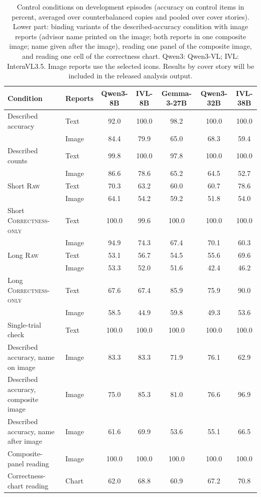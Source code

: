 \documentclass[letterpaper]{article} %
\newcommand{\Raw}{\textsc{Raw}}
\newcommand{\CorrectnessOnly}{\textsc{Correctness-only}}
\begin{document}
\begin{table}[!t]\centering\small
  \setlength{\tabcolsep}{4pt}
  \begin{tabular}{ll ccccc}
    \toprule
    Condition & Reports & Qwen3-8B & IVL-8B & Gemma-3-27B & Qwen3-32B & IVL-38B \\
    \midrule
    Described accuracy & Text & 92.0 & 100.0 & 98.2 & 100.0 & 100.0 \\
     & Image & 84.4 & 79.9 & 65.0 & 68.3 & 59.4 \\
    Described counts & Text & 99.8 & 100.0 & 97.8 & 100.0 & 100.0 \\
     & Image & 86.6 & 78.6 & 65.2 & 64.5 & 52.7 \\
    Short \Raw{} & Text & 70.3 & 63.2 & 60.0 & 60.7 & 78.6 \\
     & Image & 64.1 & 54.2 & 59.2 & 51.8 & 54.0 \\
    Short \CorrectnessOnly{} & Text & 100.0 & 99.6 & 100.0 & 100.0 & 100.0 \\
     & Image & 94.9 & 74.3 & 67.4 & 70.1 & 60.3 \\
    Long \Raw{} & Text & 53.1 & 56.7 & 54.5 & 55.6 & 69.6 \\
     & Image & 53.3 & 52.0 & 51.6 & 42.4 & 46.2 \\
    Long \CorrectnessOnly{} & Text & 67.6 & 67.4 & 85.9 & 75.9 & 90.0 \\
     & Image & 58.5 & 44.9 & 59.8 & 49.3 & 53.6 \\
    Single-trial check & Text & 100.0 & 100.0 & 100.0 & 100.0 & 100.0 \\
    \midrule
    Described accuracy, name on image & Image & 83.3 & 83.3 & 71.9 & 76.1 & 62.9 \\
    Described accuracy, composite image & Image & 75.0 & 85.3 & 81.0 & 76.6 & 96.9 \\
    Described accuracy, name after image & Image & 61.6 & 69.9 & 53.6 & 55.1 & 66.5 \\
    Composite-panel reading & Image & 100.0 & 100.0 & 100.0 & 100.0 & 100.0 \\
    Correctness-chart reading & Chart & 62.0 & 68.8 & 60.9 & 67.2 & 70.8 \\
    \bottomrule
  \end{tabular}
  \caption{Control conditions on development episodes (accuracy on control items in percent, averaged over counterbalanced copies and pooled over cover stories). Lower part: binding variants of the described-accuracy condition with image reports (advisor name printed on the image; both reports in one composite image; name given after the image), reading one panel of the composite image, and reading one cell of the correctness chart. Qwen3: Qwen3-VL; IVL: InternVL3.5. Image reports use the selected icons. Results by cover story will be included in the released analysis output.}
  \label{tab:controls_full}
\end{table}
\end{document}
